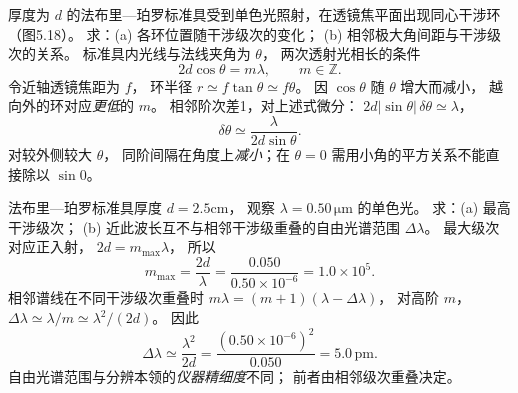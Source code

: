 厚度为 $d$ 的法布里—珀罗标准具受到单色光照射，在透镜焦平面出现同心干涉环（图5.18）。
求：(a) 各环位置随干涉级次的变化；
(b) 相邻极大角间距与干涉级次的关系。
\exsolution
标准具内光线与法线夹角为 $\theta$，
两次透射光相长的条件
\[
\boxed{2d\cos\theta=m\lambda},\qquad m\in\mathbb Z.
\]
令近轴透镜焦距为 $f$，
环半径 $r\simeq f\tan\theta\simeq f\theta$。
因 $\cos\theta$ 随 $\theta$ 增大而减小，
越向外的环对应\emph{更低}的 $m$。
相邻阶次差1，对上述式微分：
$2d|\sin\theta|\,\delta\theta\simeq\lambda$，
\[
\boxed{\delta\theta\simeq\frac{\lambda}{2d\sin\theta}}.
\]
\excheck 对较外侧较大 $\theta$，
同阶间隔在角度上\emph{减小}；在 $\theta=0$ 需用小角的平方关系不能直接除以 $\sin0$。

法布里—珀罗标准具厚度 $d=2.5$cm，
观察 $\lambda=0.50\,\mathrm{\mu m}$ 的单色光。
求：(a) 最高干涉级次；
(b) 近此波长互不与相邻干涉级重叠的自由光谱范围 $\Delta\lambda$。
\exsolution
最大级次对应正入射，
$2d=m_{\max}\lambda$，
所以
\[
\boxed{m_{\max}=\frac{2d}{\lambda}
=\frac{0.050}{0.50\times10^{-6}}
=1.0\times10^5}.
\]
相邻谱线在不同干涉级次重叠时
$m\lambda=(m+1)(\lambda-\Delta\lambda)$，
对高阶 $m$，
$\Delta\lambda\simeq\lambda/m\simeq\lambda^2/(2d)$。
因此
\[
\boxed{\Delta\lambda\simeq
\frac{\lambda^2}{2d}
=\frac{(0.50\times10^{-6})^2}{0.050}
=5.0\,\mathrm{pm}}.
\]
\excheck 自由光谱范围与分辨本领的\emph{仪器精细度}不同；
前者由相邻级次重叠决定。
